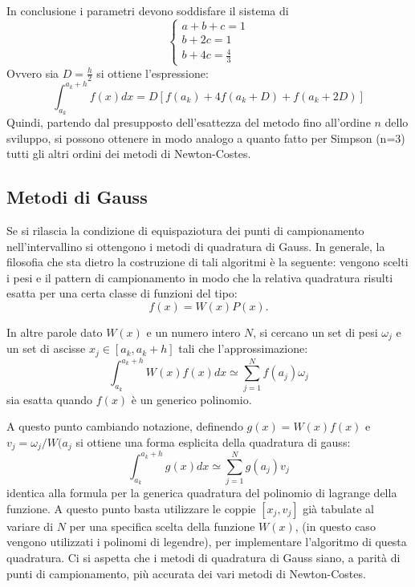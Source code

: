 \documentclass{article}
\begin{document}
In conclusione i parametri devono soddisfare il sistema di 
	\begin{displaymath}
		\left\{
			\begin{array}{l}
			a+b+c=1 \\
			b+2c=1 \\
			b+4c=\frac{4}{3}
 			\end{array} 
		\right.
	\end{displaymath}
Ovvero sia $D= \frac{h}{2}$ si ottiene l'espressione:
	\begin{equation}
	\int_{a_{k}}^{a_{k}+h}f(x)dx= D[f(a_{k})+4f(a_{k}+D)+f(a_{k}+2D)]
	\end{equation}
Quindi, partendo dal presupposto dell'esattezza del metodo fino all'ordine $n$ dello sviluppo, si possono ottenere in modo analogo a quanto fatto per Simpson (n=3) tutti gli altri ordini dei metodi di Newton-Costes.

\subsection{Metodi di Gauss}
Se si rilascia la condizione di equispaziotura dei punti di campionamento nell'intervallino si ottengono i metodi di quadratura di Gauss.
In generale, la filosofia che sta dietro la costruzione di tali algoritmi è la seguente: vengono scelti i pesi e il pattern di campionamento in modo che la relativa quadratura risulti esatta per una certa classe di funzioni del tipo:
$$f(x)=W(x)P(x) .$$

In altre parole dato $W(x)$ e un numero intero $N$, si cercano un set di pesi $\omega_{j}$ e un set di ascisse $x_{j} \in [a_{k},a_{k}+h]$ tali che l'approssimazione:
	\begin{equation}
	\int_{a_{k}}^{a_{k}+h}W(x)f(x)dx\simeq \sum_{j=1}^{N}f(a_{j})\omega_{j}
	\end{equation}
sia esatta quando $f(x)$ è un generico polinomio.

A questo punto cambiando notazione, definendo $g(x)=W(x)f(x)$ e $v_{j}=\omega_{j}/W(a_{j}$ si ottiene una forma esplicita della quadratura di gauss:
	\begin{equation}
	\int_{a_{k}}^{a_{k}+h}g(x)dx \simeq \sum_{j=1}^{N}g(a_{j})v_{j}
	\end{equation}
identica alla formula per la generica quadratura del polinomio di lagrange della funzione.
A questo punto basta utilizzare le coppie $[x_{j},v_{j}]$ già tabulate al variare di $N$ per una specifica scelta della funzione $W(x)$, (in questo caso vengono utilizzati i polinomi di legendre), per implementare l'algoritmo di questa quadratura.
Ci si aspetta che i metodi di quadratura di Gauss siano, a parità di punti di campionamento, più accurata dei vari metodi di Newton-Costes.
\end{document}
